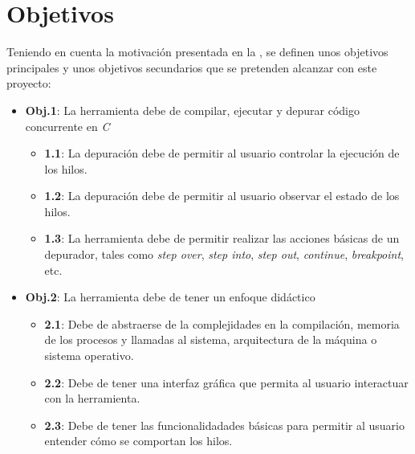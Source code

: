 \section{Objetivos}\label{sec:objetivos}
Teniendo en cuenta la motivación presentada en la , se definen unos objetivos principales y unos objetivos secundarios que se pretenden alcanzar con este proyecto:
\begin{itemize}

    \item \textbf{Obj.1}: La herramienta debe de compilar, ejecutar y depurar código concurrente en \textit{C}
    \begin{itemize}
        \item \textbf{1.1}: La depuración debe de permitir al usuario controlar la ejecución de los hilos.
        \item \textbf{1.2}: La depuración debe de permitir al usuario observar el estado de los hilos.
        \item \textbf{1.3}: La herramienta debe de permitir realizar las acciones básicas de un depurador, tales como \textit{step over}, \textit{step into}, \textit{step out}, \textit{continue}, \textit{breakpoint}, etc.
    \end{itemize}
     
    \item \textbf{Obj.2}: La herramienta debe de tener un enfoque didáctico\label{obj:didactico}
    \begin{itemize}
        \item \textbf{2.1}: Debe de abstraerse de la complejidades en la compilación, memoria de los procesos y llamadas al sistema, arquitectura de la máquina o sistema operativo.
        \item \textbf{2.2}: Debe de tener una \gls{interfaz gráfica} que permita al usuario interactuar con la herramienta.
        \item \textbf{2.3}: Debe de tener las funcionalidadades básicas para permitir al usuario entender cómo se comportan los hilos.
    \end{itemize}

\end{itemize}

